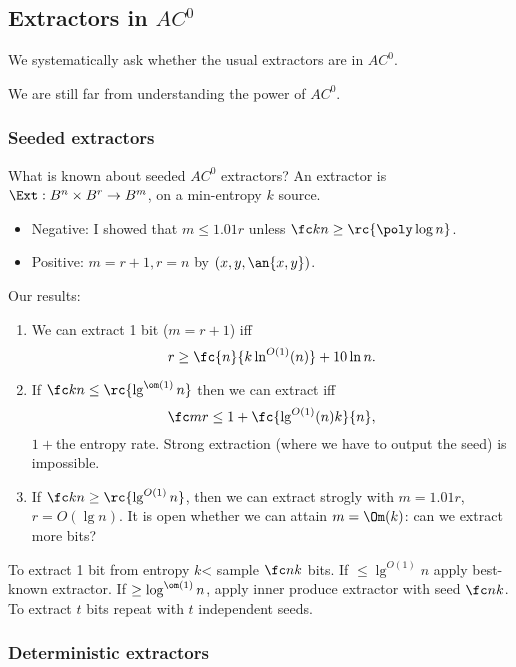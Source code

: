 \subsection{Extractors in $AC^0$}

We systematically ask whether the usual extractors are in $AC^0$.

We are still far from understanding the power of $AC^0$.


\subsubsection{Seeded extractors}

What is known about seeded $AC^0$ extractors? 
An extractor is $\Ext:B^n\times B^r\to B^m$, on a min-entropy $k$ source.
\begin{itemize}
\item
Negative: I showed that $m\le 1.01r$ unless $\fc kn\ge \rc{\poly\log n}$.
\item
Positive: $m=r+1,r=n$ by $(x,y,\an{x,y})$.
\end{itemize}

Our results:
\begin{enumerate}
\item
We can extract 1 bit ($m=r+1$) iff 
\[
r\ge \fc{n}{k\ln^{O(1)}(n)} + 10 \ln n . 
\]
\item
If $\fc kn\le \rc{\lg^{\om(1)}n}$ then we can extract iff
\[
\fc mr\le 1+\fc{\lg^{O(1)}(n)k}{n},
\]
$1+$the entropy rate. Strong extraction (where we have to output the seed) is impossible.
\item
If $\fc kn\ge \rc{\lg^{O(1)}n}$, then we can extract strogly with $m=1.01r$, $r=O(\lg n)$. It is open whether we can attain $m=\Om(k)$: can we extract more bits?
\end{enumerate}


To extract 1 bit from entropy $k$< sample $\fc nk$ bits. If $\le \lg^{O(1)}n$ apply best-known extractor. If $\ge\log^{\om(1)}n$, apply inner produce extractor with seed $\fc nk$. To extract $t$ bits repeat with $t$ independent seeds.

\subsubsection{Deterministic extractors}

